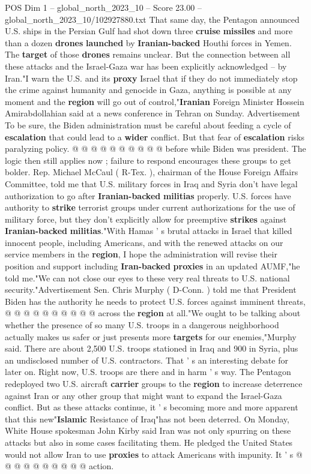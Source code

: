 \begin{textsample}{POS Dim 1 – global\_north\_2023\_10 – Score 23.00 – global\_north\_2023\_10/102927880.txt}
That same day, the Pentagon announced U.S. ships in the Persian Gulf had shot down three \textbf{cruise} \textbf{missiles} and more than a dozen \textbf{drones} \textbf{launched} by \textbf{Iranian-backed} Houthi forces in Yemen.
The \textbf{target} of those \textbf{drones} remains unclear.
But the connection between all these attacks and the Israel-Gaza war has been explicitly acknowledged -- by Iran."I warn the U.S. and its \textbf{proxy} Israel that if they do not immediately stop the crime against humanity and genocide in Gaza, anything is possible at any moment and the \textbf{region} will go out of control,"\textbf{Iranian} Foreign Minister Hossein Amirabdollahian said at a news conference in Tehran on Sunday.
Advertisement To be sure, the Biden administration must be careful about feeding a cycle of \textbf{escalation} that could lead to a \textbf{wider} conflict.
But that fear of \textbf{escalation} risks paralyzing policy. @ @ @ @ @ @ @ @ @ @ before while Biden was president.
The logic then still applies now ; failure to respond encourages these groups to get bolder.
Rep.
Michael McCaul ( R-Tex. ), chairman of the House Foreign Affairs Committee, told me that U.S. military forces in Iraq and Syria don't have legal authorization to go after \textbf{Iranian-backed} \textbf{militias} properly.
U.S. forces have authority to \textbf{strike} terrorist groups under current authorizations for the use of military force, but they don't explicitly allow for preemptive \textbf{strikes} against \textbf{Iranian-backed} \textbf{militias}."With Hamas ' s brutal attacks in Israel that killed innocent people, including Americans, and with the renewed attacks on our service members in the \textbf{region}, I hope the administration will revise their position and support including \textbf{Iran-backed} \textbf{proxies} in an updated AUMF,"he told me."We can not close our eyes to these very real threats to U.S. national security."Advertisement Sen.
Chris Murphy ( D-Conn. ) told me that President Biden has the authority he needs to protect U.S. forces against imminent threats, @ @ @ @ @ @ @ @ @ @ across the \textbf{region} at all."We ought to be talking about whether the presence of so many U.S. troops in a dangerous neighborhood actually makes us safer or just presents more \textbf{targets} for our enemies,"Murphy said.
There are about 2,500 U.S. troops stationed in Iraq and 900 in Syria, plus an undisclosed number of U.S. contractors.
That ' s an interesting debate for later on.
Right now, U.S. troops are there and in harm ' s way.
The Pentagon redeployed two U.S. aircraft \textbf{carrier} groups to the \textbf{region} to increase deterrence against Iran or any other group that might want to expand the Israel-Gaza conflict.
But as these attacks continue, it ' s becoming more and more apparent that this new"\textbf{Islamic} Resistance of Iraq"has not been deterred.
On Monday, White House spokesman John Kirby said Iran was not only spurring on these attacks but also in some cases facilitating them.
He pledged the United States would not allow Iran to use \textbf{proxies} to attack Americans with impunity.
It ' s @ @ @ @ @ @ @ @ @ @ action.


\end{textsample}
